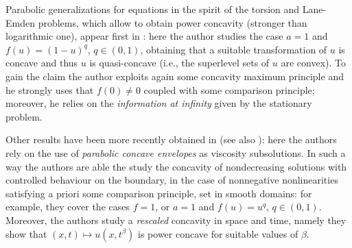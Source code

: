 \documentclass[11pt, reqno]{amsart}
\theoremstyle{definition}
\numberwithin{equation}{section}
\begin{document}
Parabolic generalizations for equations in the spirit of the torsion and Lane-Emden problems, which allow to obtain power concavity (stronger than logarithmic one), appear first in \cite{kenningtonparabolic}: here the author studies the case $a=1$ and $f(u)=(1-u)^q$, $q \in (0,1)$, obtaining that a suitable transformation of $u$ is concave and thus $u$ is quasi-concave (i.e., the superlevel sets of $u$ are convex). 
To gain the claim the author exploits again some concavity maximum principle and he strongly uses that $f(0) \neq 0$ coupled with some comparison principle; moreover, he relies on the \emph{information at infinity} given by the stationary problem. 

Other results have been more recently obtained in \cite{IsSa13, IsSa16} (see also \cite{ILS20}):
here the authors rely on the use of \emph{parabolic concave envelopes} as viscosity subsolutions.
In such a way the authors are able the study the concavity of nondecreasing solutions with controlled behaviour on the boundary, in the case of nonnegative nonlinearities satisfying a priori some comparison principle, set in smooth domains: for example, they cover the cases $f=1$, or $a=1$ and $f(u)=u^q$, $q \in (0,1)$. Moreover, the authors study a \emph{rescaled} concavity in space and time, namely they show that $(x,t) \mapsto u(x,t^{\beta})$ is power concave for suitable values of $\beta$. 

\smallskip
\end{document}
